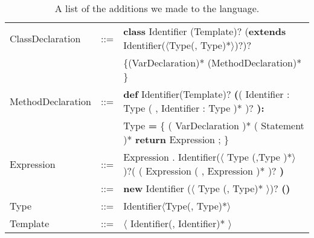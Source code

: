 \begin{table}[h]
  \caption{A list of the additions we made to the language.}
  \begin{tabular}{ l  c  l}
    \hline
    ClassDeclaration & ::= & \textbf{class} Identifier (Template)?
    (\textbf{extends} Identifier($\langle$Type(, Type)*$\rangle$)?)?  \\
    && \{(VarDeclaration)* (MethodDeclaration)* \}  \\
    \hline
    MethodDeclaration & ::= & \textbf{def} Identifier(Template)?
    \textbf{(}( Identifier : Type ( , Identifier : Type )* )? \textbf{):}\\
    &&Type \textbf{=}
    \{ ( VarDeclaration )* ( Statement )*
    \textbf{return} Expression ; \}\\
    \hline
    Expression & ::= &  Expression . Identifier($\langle$ Type (,Type )*$\rangle$ )?( ( Expression ( , Expression )* )? \textbf{)} \\
               & ::= & \textbf{new} Identifier ($\langle$ Type (, Type)* $\rangle$)? \textbf{()} \\
    \hline
    Type & ::= & Identifier$\langle$Type(, Type)*$\rangle$ \\
    \hline
    Template & ::= & $\langle$ Identifier(, Identifier)* $\rangle$ \\
    \hline
  \end{tabular}
\end{table}
